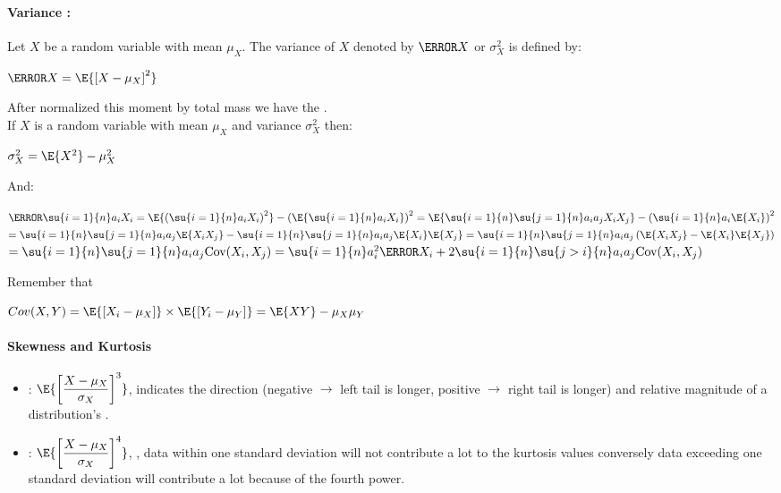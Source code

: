 \paragraph{Variance :}
Let $X$ be a random variable with mean $\mu_{X}$. The variance of $X$ 
denoted by $\V{X}$ or $\sigma_{X}^{2}$ is defined by:
\begin{center}
	$\V{X}=\E{\left[ X-\mu_{X} \right]^{2}}$
\end{center}
After normalized this moment by total mass we have the .\\
If $X$ is a random variable with mean $\mu_{X}$ and variance $\sigma_{X}^{2}$ then:
\begin{center}
$\sigma_{X}^{2}=\E{X^{2}}-\mu_{X}^{2}$
\end{center}
And:
\begin{center}
	$\V{\su{i=1}{n}a_{i}X_{i}} = \E{\left(\su{i=1}{n}a_{i}X_{i}\right)^{2}} - \left(\E{\su{i=1}{n}a_{i}X_{i}}\right)^{2}
	= \E{\su{i=1}{n}\su{j=1}{n}a_{i}a_{j}X_{i}X_{j}} - \left(\su{i=1}{n}a_{i}\E{X_{i}}\right)^{2}$\\
	$= \su{i=1}{n}\su{j=1}{n}a_{i}a_{j}\E{X_{i}X_{j}} - \su{i=1}{n}\su{j=1}{n}a_{i}a_{j}\E{X_{i}}\E{X_{j}}
	= \su{i=1}{n}\su{j=1}{n}a_{i}a_{j}\left(\E{X_{i}X_{j}} - \E{X_{i}}\E{X_{j}}\right)$\\
	$= \su{i=1}{n}\su{j=1}{n}a_{i}a_{j}\text{Cov}(X_{i},X_{j})
	= \su{i=1}{n}a_{i}^{2}\V{X_{i}} + 2\su{i=1}{n}\su{j>i}{n}a_{i}a_{j}\text{Cov}(X_{i},X_{j})$
\end{center}

Remember that 
\begin{center}
    $Cov(X, Y) = \E{\left[X_i - \mu_X\right]} \times \E{\left[Y_i - \mu_Y\right]} = \E{XY} -\mu_X\mu_Y$
\end{center}


\paragraph{Skewness and Kurtosis}
\begin{itemize}
    \item {}: $\E{\left[ \dfrac{X-\mu_{X}}{\sigma_{X}} \right]^{3}}$, indicates
        the direction (negative $\rightarrow$ left tail is longer, positive $\rightarrow$ 
        right tail is longer) and relative magnitude of a distribution's .
    \item {}: $\E{\left[ \dfrac{X-\mu_{X}}{\sigma_{X}} \right]^{4}}$, , data within one standard deviation will not contribute a lot to the 
        kurtosis values conversely data exceeding one standard deviation will contribute a
        lot because of the fourth power.
\end{itemize}


